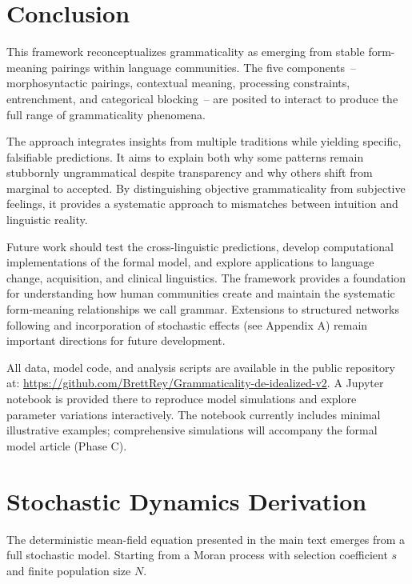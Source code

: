 \documentclass[12pt]{article}
\begin{document}
\section{Conclusion}

This framework reconceptualizes grammaticality as emerging from stable form-meaning pairings within language communities. The five components~-- morphosyntactic pairings, contextual meaning, processing constraints, entrenchment, and categorical blocking~-- are posited to interact to produce the full range of grammaticality phenomena.

The approach integrates insights from multiple traditions while yielding specific, falsifiable predictions. It aims to explain both why some patterns remain stubbornly ungrammatical despite transparency and why others shift from marginal to accepted. By distinguishing objective grammaticality from subjective feelings, it provides a systematic approach to mismatches between intuition and linguistic reality.

Future work should test the cross-linguistic predictions, develop computational implementations of the formal model, and explore applications to language change, acquisition, and clinical linguistics. The framework provides a foundation for understanding how human communities create and maintain the systematic form-meaning relationships we call grammar. Extensions to structured networks following \textcite{baxter2006} and incorporation of stochastic effects (see Appendix A) remain important directions for future development.

\begin{tcolorbox}[colback=lsLightBlue!20,title=Data and code availability]
All data, model code, and analysis scripts are available in the public repository at: 
\url{https://github.com/BrettRey/Grammaticality-de-idealized-v2}.
A Jupyter notebook is provided there to reproduce model simulations and explore parameter variations interactively. The notebook currently includes minimal illustrative examples; comprehensive simulations will accompany the formal model article (Phase C).
\end{tcolorbox}


\newpage
\appendix

\section{Stochastic Dynamics Derivation}

The deterministic mean-field equation presented in the main text emerges from a full stochastic model. Starting from a Moran process with selection coefficient $s$ and finite population size $N$.
\end{document}
